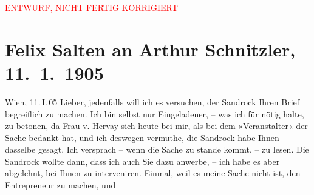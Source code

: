 
\begin{center}
            \textcolor{red}{ENTWURF, NICHT FERTIG KORRIGIERT}
                      \end{center}
            
         
         \renewcommand{\erwaehntePersonen}{Personen: Elvira Leontine Hervay von Kirchberg, Adele Sandrock}
         \renewcommand{\erwaehnteOrte}{Orte: Wien}
         \renewcommand{\erwaehnteWerke}{}
               \section[Felix Salten an Arthur Schnitzler, 11. 1. 1905]{ Felix Salten an Arthur Schnitzler, 11. 1. 1905}\nopagebreak{}\rehead{ }\begin{ledgroupsized}[t]{13cm}\normalsize\beginnumbering \toendnotes[C]{\smallbreak\pagebreak[2]} 
\pstart
           {\pb}Wien, 11. I. 05\pend
           \pstart
           Lieber, jedenfalls will ich es versuchen, der Sandrock Ihren Brief begreiflich zu machen. Ich bin selbst
               nur Eingeladener, – was ich für nötig halte, zu betonen, da Frau v. Hervay sich heute bei mir, als bei dem »Veranstalter« der
               Sache bedankt hat, und ich deswegen vermuthe, die Sandrock habe Ihnen dasselbe gesagt. Ich versprach – wenn die Sache zu
               stande kommt, – zu lesen. Die Sandrock wollte
               dann, dass ich auch Sie dazu anwerbe, – ich habe es aber abgelehnt, bei Ihnen zu
               interveniren. Einmal, weil es meine Sache nicht ist, den Entrepreneur zu machen, und

\end{ledgroupsized}
